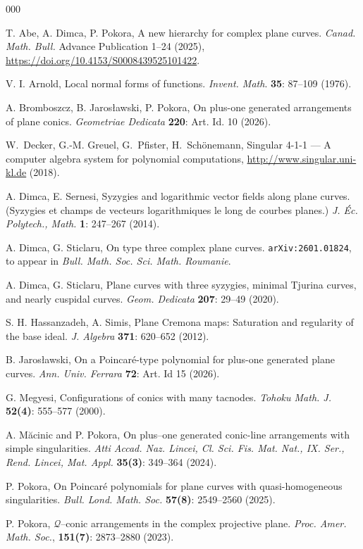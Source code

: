 \documentclass[11pt]{article}
\theoremstyle{plain}
\theoremstyle{definition}
\begin{document}
\begin{thebibliography}{000}

 T. Abe, A. Dimca, P. Pokora, A new hierarchy for complex plane curves. {\it Canad. Math. Bull.} Advance Publication 1--24 (2025), \url{https://doi.org/10.4153/S0008439525101422}.

 V. I. Arnold, Local normal forms of functions. \textit{Invent. Math}. {\bf 35}: 87--109 (1976).

 A. Bromboszcz, B. Jarosławski, P. Pokora, On plus-one generated arrangements of plane conics. {\it Geometriae Dedicata} {\bf 220}: Art. Id. 10 (2026).

 W.~Decker, G.-M. Greuel, G.~Pfister, H.~Sch\"onemann, Singular {4-1-1} --- {A} computer algebra system for polynomial computations, \url{http://www.singular.uni-kl.de} (2018).

A. Dimca, E. Sernesi, Syzygies and logarithmic vector fields along plane curves. (Syzygies et champs de vecteurs logarithmiques le long de courbes planes.) \textit{J. \'Ec. Polytech., Math.} \textbf{1}: 247--267 (2014).

 A. Dimca, G. Sticlaru, On type three complex plane curves. \texttt{arXiv:2601.01824}, to appear in \textit{Bull. Math. Soc. Sci. Math. Roumanie}.

A. Dimca, G. Sticlaru, Plane curves with three syzygies, minimal Tjurina curves, and nearly cuspidal curves. \textit{Geom. Dedicata}  {\bf 207}:  29--49 (2020).

 S. H. Hassanzadeh, A. Simis, Plane Cremona maps: Saturation and regularity of the base ideal. \textit{J. Algebra} \textbf{371}: 620--652 (2012).

B. Jarosławski, On a Poincaré-type polynomial for plus-one generated plane curves. \textit{Ann. Univ. Ferrara} \textbf{72}: Art. Id 15 (2026).

 G. Megyesi, Configurations of conics with many tacnodes. {\it Tohoku Math. J.} {\bf 52(4)}: 555--577 (2000).

 A. M\u{a}cinic and P. Pokora, On plus–one generated conic-line arrangements with simple singularities. {\it Atti Accad. Naz. Lincei, Cl. Sci. Fis. Mat. Nat., IX. Ser., Rend. Lincei, Mat. Appl.} {\bf 35(3)}: 349--364 (2024).

 P. Pokora, On Poincar\'e polynomials for plane curves with quasi-homogeneous singularities. { \it Bull. Lond. Math. Soc.} {\bf 57(8)}: 2549--2560 (2025).

 P. Pokora, $\mathcal{Q}$--conic arrangements in the complex projective plane. {\it Proc. Amer. Math. Soc.}, {\bf 151(7)}: 2873--2880 (2023).

\end{thebibliography}
\end{document}
